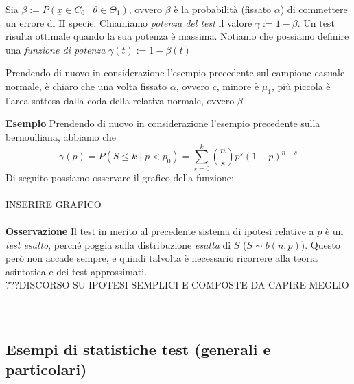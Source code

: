 \begin{definizione} Sia $\beta := P(\underline{x} \in C_0 \mid \theta \in \Theta_1)$, ovvero $\beta$ è la probabilità (fissato $\alpha$) di commettere un errore di II specie. Chiamiamo \textit{potenza del test} il valore $\gamma := 1-\beta$. Un test risulta ottimale quando la sua potenza è massima. Notiamo che possiamo definire una \textit{funzione di potenza} $\gamma(t) := 1-\beta(t)$
\end{definizione}
\begin{oss} Prendendo di nuovo in considerazione l'esempio precedente sul campione casuale normale, è chiaro che una volta fissato $\alpha$, ovvero $c$, minore è $\mu_1$, più piccola è l'area sottesa dalla coda della relativa normale, ovvero $\beta$.
\end{oss}
\noindent \textbf{Esempio} Prendendo di nuovo in considerazione l'esempio precedente sulla bernoulliana, abbiamo che 
			$$\gamma(p) = P(S \leq k \mid p<p_0) = \displaystyle \sum_{s=0}^k \binom{n}{s} p^s (1-p)^{n-s}$$
Di seguito possiamo osservare il grafico della funzione:\\
\\
INSERIRE GRAFICO\\
\\
\textbf{Osservazione} Il test in merito al precedente sistema di ipotesi relative a $p$ è un \textit{test esatto}, perché poggia sulla distribuzione \textit{esatta} di $S$ ($S \sim b(n,p)$). Questo però non accade sempre, e quindi talvolta è necessario ricorrere alla teoria asintotica e dei test approssimati.\\
???DISCORSO SU IPOTESI SEMPLICI E COMPOSTE DA CAPIRE MEGLIO\\
\\
\\
\subsection{Esempi di statistiche test (generali e particolari)}

